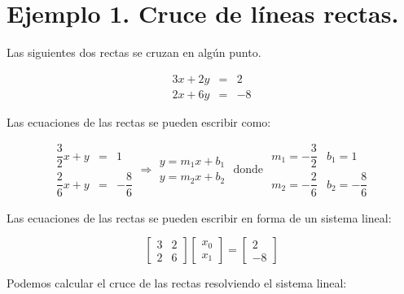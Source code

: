 \documentclass[
  letterpaper,
  DIV=11,
  numbers=noendperiod]{scrreprt}
\begin{document}
\section{\texorpdfstring{\textbf{Ejemplo 1. Cruce de líneas
rectas.}}{Ejemplo 1. Cruce de líneas rectas.}}\label{ejemplo-1.-cruce-de-luxedneas-rectas.}

Las siguientes dos rectas se cruzan en algún punto.

\[
\begin{array}{ccc}
3x + 2y & = &2 \\
2x + 6y & = &-8
\end{array}
\]

Las ecuaciones de las rectas se pueden escribir como:

\[
\begin{array}{ccc}
\dfrac{3}{2}x + y & = & 1 \\
\dfrac{2}{6}x + y & = & -\dfrac{8}{6}
\end{array} \Longrightarrow
\begin{array}{ccc}
y = m_1 x + b_1 \\
y = m_2 x + b_2
\end{array} \text{ donde }
\begin{array}{ccc}
m_1 = -\dfrac{3}{2} & b_1 = 1 \\
m_2 = -\dfrac{2}{6} & b_2 = -\dfrac{8}{6}
\end{array}
\]

Las ecuaciones de las rectas se pueden escribir en forma de un sistema
lineal:

\[
\left[
\begin{array}{cc}
3 & 2 \\
2 & 6
\end{array} \right]
\left[
\begin{array}{c}
x_{0} \\
x_{1}
\end{array} \right] =
\left[
\begin{array}{c}
2 \\ 
-8
\end{array} \right]
\tag{1}
\]

Podemos calcular el cruce de las rectas resolviendo el sistema lineal:
\end{document}
